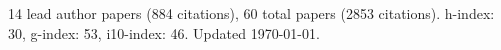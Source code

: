 14 lead author papers (884 citations),
60 total papers (2853 citations).\newline
h-index: 30, g-index: 53, i10-index: 46. Updated \today.